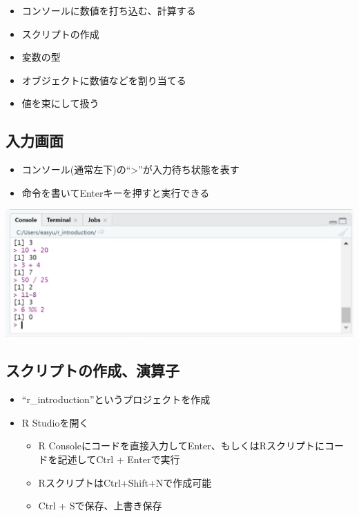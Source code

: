 \documentclass[
]{ltjsarticle}
\providecommand{\tightlist}{%
  \setlength{\itemsep}{0pt}\setlength{\parskip}{0pt}}
\begin{document}
\begin{itemize}
\tightlist
\item
  コンソールに数値を打ち込む、計算する
\item
  スクリプトの作成
\item
  変数の型
\item
  オブジェクトに数値などを割り当てる
\item
  値を束にして扱う
\end{itemize}

\hypertarget{ux5165ux529bux753bux9762}{%
\subsection{入力画面}\label{ux5165ux529bux753bux9762}}

\begin{itemize}
\tightlist
\item
  コンソール(通常左下)の``\textgreater{}''が入力待ち状態を表す
\item
  命令を書いてEnterキーを押すと実行できる
\end{itemize}

\begin{center}\includegraphics[width=0.95\linewidth]{figs/console} \end{center}

\hypertarget{ux30b9ux30afux30eaux30d7ux30c8ux306eux4f5cux6210ux6f14ux7b97ux5b50}{%
\subsection{スクリプトの作成、演算子}\label{ux30b9ux30afux30eaux30d7ux30c8ux306eux4f5cux6210ux6f14ux7b97ux5b50}}

\begin{itemize}
\item
  ``r\_introduction''というプロジェクトを作成
\item
  R Studioを開く

  \begin{itemize}
  \tightlist
  \item
    R
    Consoleにコードを直接入力してEnter、もしくはRスクリプトにコードを記述してCtrl
    + Enterで実行
  \item
    RスクリプトはCtrl+Shift+Nで作成可能
  \item
    Ctrl + Sで保存、上書き保存
  \end{itemize}
\end{itemize}
\end{document}
